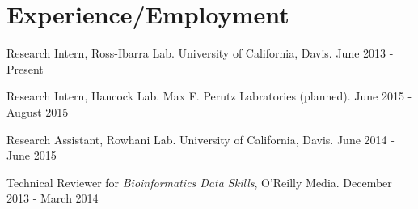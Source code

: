 \documentclass[letterpaper]{article}
\renewenvironment{itemize}{
  \begin{list}{}{
    \setlength{\leftmargin}{1.5em}
  }
}{
  \end{list}
}
\begin{document}
\section*{Experience/Employment}
\begin{itemize}
\item Research Intern, Ross-Ibarra Lab. University of California, Davis. \hfill June 2013 - Present
\item Research Intern, Hancock Lab. Max F. Perutz Labratories (planned). \hfill June 2015 - August 2015
\item Research Assistant, Rowhani Lab. University of California, Davis. \hfill June 2014 - June 2015
\item Technical Reviewer for \textit{Bioinformatics Data Skills}, O'Reilly Media. \hfill December 2013 - March 2014

\end{itemize}
\end{document}

